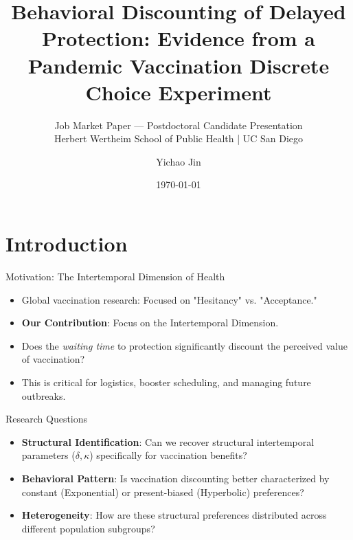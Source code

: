 \documentclass[10pt]{beamer}
\title{Behavioral Discounting of Delayed Protection: Evidence from a
Pandemic Vaccination Discrete Choice Experiment}
\subtitle{Job Market Paper --- Postdoctoral Candidate Presentation \\
\vspace{0.2em}
\small Herbert Wertheim School of Public Health | UC San Diego}
\author{Yichao Jin}
\institute{The University of Texas at Dallas}
\date{\today}
\begin{document}
\maketitle

\section{Introduction}

\begin{frame}{Motivation: The Intertemporal Dimension of Health}
    \begin{itemize}
        \item Global vaccination research: Focused on "Hesitancy" vs. "Acceptance."
        \item \textbf{Our Contribution}: Focus on the \alert{Intertemporal Dimension}.
        \item Does the \textit{waiting time} to protection significantly discount the perceived value of vaccination?
        \item This is critical for logistics, booster scheduling, and managing future outbreaks.
    \end{itemize}
\end{frame}

\begin{frame}{Research Questions}
    \begin{itemize}
        \item \textbf{Structural Identification}: Can we recover structural intertemporal parameters ($\delta, \kappa$) specifically for vaccination benefits?
        \item \textbf{Behavioral Pattern}: Is vaccination discounting better characterized by \alert{constant (Exponential)} or \alert{present-biased (Hyperbolic)} preferences?
        \item \textbf{Heterogeneity}: How are these structural preferences distributed across different population subgroups?
    \end{itemize}
\end{frame}

\end{document}
